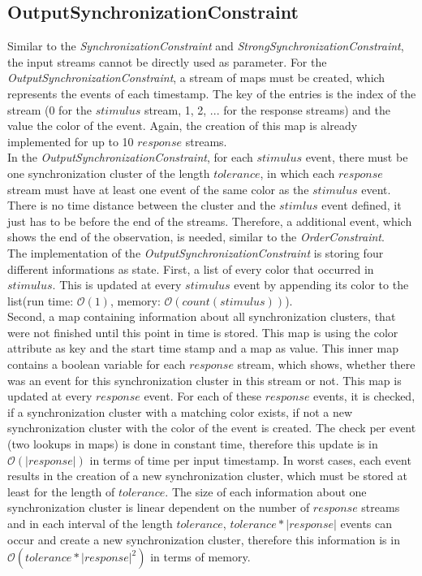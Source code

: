 \subsection{OutputSynchronizationConstraint}
	Similar to the \emph{SynchronizationConstraint} and \emph{StrongSynchronizationConstraint}, the input streams cannot be directly used as parameter. For the \emph{OutputSynchronizationConstraint}, a stream of maps must be created, which represents the events of each timestamp. The key of the entries is the index of the stream (0 for the $stimulus$ stream, 1, 2, ... for the response streams) and the value the color of the event. Again, the creation of this map is already implemented for up to 10 $response$ streams.\\
	In the \emph{OutputSynchronizationConstraint}, for each $stimulus$ event, there must be one synchronization cluster of the length $tolerance$, in which each $response$ stream must have at least one event of the same color as the $stimulus$ event. There is no time distance between the cluster and the $stimlus$ event defined, it just has to be before the end of the streams. Therefore, a additional event, which shows the end of the observation, is needed, similar to the \emph{OrderConstraint}.\\
	The implementation of the \emph{OutputSynchronizationConstraint} is storing four different informations as state. First, a list of every color that occurred in $stimulus$. This is updated at every $stimulus$ event by appending its color to the list(run time: $\mathcal{O}(1)$, memory: $\mathcal{O}(count(stimulus))$).\\
	Second, a map containing information about all synchronization clusters, that were not finished until this point in time is stored. This map is using the color attribute as key and the start time stamp and a map as value. This inner map contains a boolean variable for each $response$ stream, which shows, whether there was an event for this synchronization cluster in this stream or not. This map is updated at every $response$ event. For each of these $response$ events, it is checked, if a synchronization cluster with a matching color exists, if not a new synchronization cluster with the color of the event is created. The check per event (two lookups in maps)  is done in constant time, therefore this update is in $\mathcal{O}(|response|)$ in terms of time per input timestamp. In worst cases, each event results in the creation of a new synchronization cluster, which must be stored at least for the length of $tolerance$. The size of each information about one synchronization cluster is linear dependent on the number of $response$ streams and in each interval of the length $tolerance$, $tolerance*|response|$ events can occur and create a new synchronization cluster, therefore this information is in $\mathcal{O}(tolerance*|response|^2)$ in terms of memory. 
